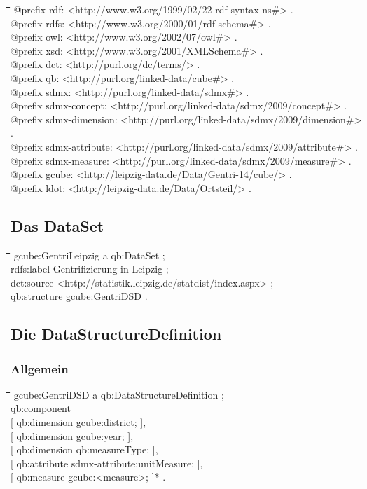 \documentclass[a4paper,11pt]{article}
\newenvironment{code}{\tt \begin{tabbing}
\hskip12pt\=\hskip12pt\=\hskip12pt\=\hskip12pt\=\hskip5cm\=\hskip5cm\=\kill}
{\end{tabbing}}
\begin{document}
\begin{code}
@prefix rdf:            <http://www.w3.org/1999/02/22-rdf-syntax-ns\#> .\\
@prefix rdfs:           <http://www.w3.org/2000/01/rdf-schema\#> .\\
@prefix owl:            <http://www.w3.org/2002/07/owl\#> .\\
@prefix xsd:            <http://www.w3.org/2001/XMLSchema\#> .\\
@prefix dct:             <http://purl.org/dc/terms/> .\\
@prefix qb:             <http://purl.org/linked-data/cube\#> .\\
@prefix sdmx:           <http://purl.org/linked-data/sdmx\#> .\\
@prefix sdmx-concept:   <http://purl.org/linked-data/sdmx/2009/concept\#> .\\
@prefix sdmx-dimension: <http://purl.org/linked-data/sdmx/2009/dimension\#> .\\
@prefix sdmx-attribute: <http://purl.org/linked-data/sdmx/2009/attribute\#> .\\
@prefix sdmx-measure:   <http://purl.org/linked-data/sdmx/2009/measure\#> .\\
@prefix gcube:          <http://leipzig-data.de/Data/Gentri-14/cube/> .\\
@prefix ldot:           <http://leipzig-data.de/Data/Ortsteil/> .
\end{code}

\subsection{Das DataSet}

\begin{code}
gcube:GentriLeipzig a qb:DataSet ;\+\\
    rdfs:label {\dq}Gentrifizierung in Leipzig{\dq} ;\\
    dct:source <http://statistik.leipzig.de/statdist/index.aspx> ;\\
    qb:structure gcube:GentriDSD .
\end{code}
          
\subsection{Die DataStructureDefinition} \label{DSS}

\subsubsection{Allgemein}
\begin{code}
gcube:GentriDSD a qb:DataStructureDefinition ;\+\\
    qb:component \+\\{}
        [ qb:dimension gcube:district; ],\\{}
        [ qb:dimension gcube:year; ],\\{}
        [ qb:dimension qb:measureType; ],\\{}
        [ qb:attribute sdmx-attribute:unitMeasure; ],\\{}
        [ qb:measure gcube:<measure>; ]* .
\end{code}
        
\end{document}
